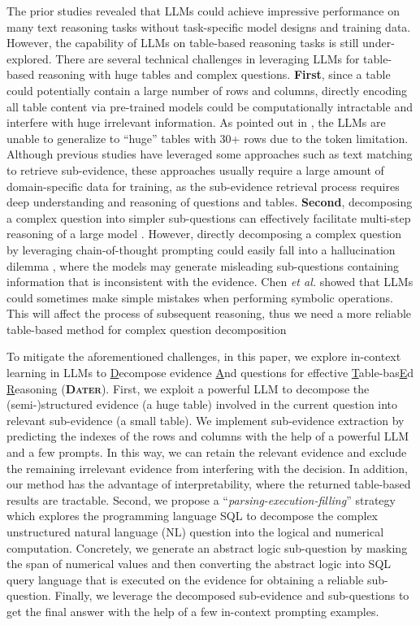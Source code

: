 The prior studies \citep{cot,zerocot} revealed that LLMs could achieve impressive performance on many text reasoning tasks without task-specific model designs and training data. However, the capability of LLMs on table-based reasoning tasks is still under-explored.  
There are several technical challenges in leveraging LLMs for table-based reasoning with huge tables and complex questions. \textbf{First}, since a table could potentially contain a large number of rows and columns, directly encoding all table content via pre-trained models could be computationally intractable and interfere with huge irrelevant information. As pointed out in \citep{llmtab}, the LLMs are unable to generalize to ``huge'' tables with 30+ rows due to the token limitation. Although previous studies have leveraged some approaches \citep{yin2020tabert,tabfact} such as text matching to retrieve sub-evidence, these approaches usually require a large amount of domain-specific data for training, as the sub-evidence retrieval process requires deep understanding and reasoning of questions and tables. 
\textbf{Second}, decomposing a complex question into simpler sub-questions can effectively facilitate multi-step reasoning of a large model \citep{huang2022language,dua2022successive,pot}. However, directly decomposing a complex question by leveraging chain-of-thought prompting \citep{cot} could easily fall into a hallucination dilemma \citep{ji2022survey}, where the models may generate misleading sub-questions containing information that is inconsistent with the evidence. 
Chen \textit{et al.} \citep{llmtab} showed that LLMs could sometimes make simple mistakes when performing symbolic operations.
This will affect the process of subsequent reasoning, thus we need a more reliable table-based method for complex question decomposition

To mitigate the aforementioned challenges, in this paper, we explore in-context learning in LLMs to \underline{D}ecompose evidence \underline{A}nd questions for effective \underline{T}able-bas\underline{E}d \underline{R}easoning (\textbf{\textsc{Dater}}). 
First, we exploit a powerful LLM to decompose the (semi-)structured evidence (a huge table) involved in the current question into relevant sub-evidence (a small table). We implement sub-evidence extraction by predicting the indexes of the rows and columns with the help of a powerful LLM and a few prompts.
In this way, we can retain the relevant evidence and exclude the remaining irrelevant evidence from interfering with the decision. In addition, our method has the advantage of interpretability, where the returned table-based results are tractable.
Second, we propose a ``\textit{parsing-execution-filling}'' strategy which explores the programming language SQL to decompose the complex unstructured natural language (NL) question into the logical and numerical computation. Concretely, we generate an abstract logic sub-question by masking the span of numerical values and then converting the abstract logic into SQL query language that is executed on the evidence for obtaining a reliable sub-question. Finally, we leverage the decomposed sub-evidence and sub-questions to get the final answer with the help of a few in-context prompting examples.  

